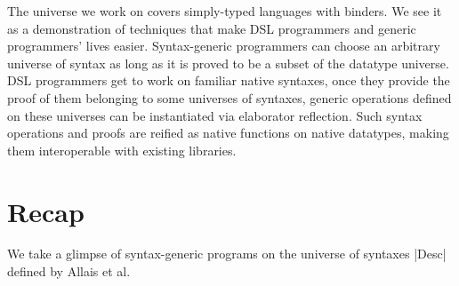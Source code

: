 \documentclass[sigplan,review,fleqn]{acmart}
\renewcommand{\verb}{\collectverb{\color{AgdaFunction}}}
\begin{document}
The universe we work on covers simply-typed languages with binders. 
We see it as a demonstration of techniques that make DSL programmers and generic programmers' lives easier.
Syntax-generic programmers can choose an arbitrary universe of syntax as long as it is proved to be a subset of the datatype universe.
DSL programmers get to work on familiar native syntaxes, once they provide the proof of them belonging to some universes of syntaxes, generic operations defined on these universes can be instantiated via elaborator reflection.
Such syntax operations and proofs are reified as native functions on native datatypes, making them interoperable with existing libraries.

\section{Recap}
\label{sec:recap}
We take a glimpse of syntax-generic programs on the universe of syntaxes \verb|Desc| defined by Allais et al.
\begin{code}
	\>[0]\AgdaSpace{}%
	\AgdaSpace{}%
	\AgdaSymbol{(}\AgdaSpace{}%
	\AgdaSymbol{:}\AgdaSpace{}%
	\AgdaSymbol{)}\AgdaSpace{}%
	\AgdaSymbol{:}\AgdaSpace{}%
	\AgdaSpace{}%
	\<%
	\\
	\>[0][@{}l@{\AgdaIndent{0}}]%
	\>[2]%
	\>[5]\AgdaSymbol{:}\AgdaSpace{}%
	\AgdaSymbol{(}\AgdaSpace{}%
	\AgdaSymbol{:}\AgdaSpace{}%
	\AgdaSymbol{)}\AgdaSpace{}%
	\AgdaSpace{}%
	\AgdaSymbol{(}\AgdaSpace{}%
	\AgdaSpace{}%
	\AgdaSpace{}%
	\AgdaSymbol{)}\AgdaSpace{}%
	\AgdaSpace{}%
	\AgdaSpace{}%
	\<%
	\\
	\>[2]\AgdaSpace{}%
	\AgdaSymbol{:}\AgdaSpace{}%
	\AgdaSpace{}%
	\AgdaSpace{}%
	\AgdaSpace{}%
	\AgdaSpace{}%
	\AgdaSpace{}%
	\AgdaSpace{}%
	\AgdaSpace{}%
	\AgdaSpace{}%
	\AgdaSpace{}%
	\<%
	\\
	\>[2]%
	\>[5]\AgdaSymbol{:}\AgdaSpace{}%
	\AgdaSpace{}%
	\AgdaSpace{}%
	\AgdaSpace{}%
	\<%
\end{code}
\end{document}
